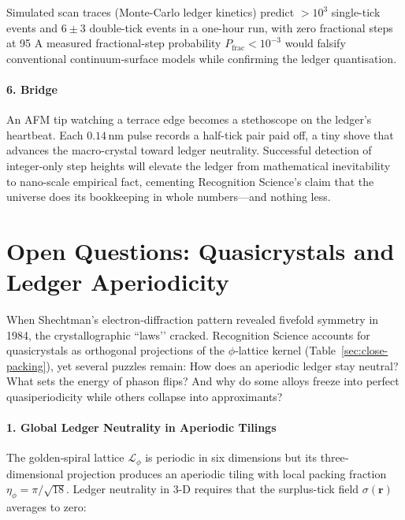 \documentclass[11pt,oneside]{book}
\begin{document}
Simulated scan traces (Monte-Carlo ledger kinetics) predict
\(>10^3\) single-tick events and
\(6\pm3\) double-tick events in a one-hour run, with zero fractional
steps at 95 %
A measured fractional-step probability
\(P_{\text{frac}}<10^{-3}\) would falsify conventional
continuum-surface models while confirming the ledger quantisation.

\paragraph*{6. Bridge}

An AFM tip watching a terrace edge becomes a stethoscope on the
ledger’s heartbeat.  
Each \(0.14\,\text{nm}\) pulse records a half-tick pair paid off, a tiny
shove that advances the macro-crystal toward ledger neutrality.
Successful detection of integer-only step heights will elevate the ledger
from mathematical inevitability to nano-scale empirical fact,
cementing Recognition Science’s claim that the universe does its
bookkeeping in whole numbers—and nothing less.

\bigskip

\section{Open Questions: Quasicrystals and Ledger Aperiodicity}
\label{sec:quasicrystal-open}



When Shechtman’s electron‐diffraction pattern revealed fivefold symmetry
in 1984, the crystallographic “laws’’ cracked.  
Recognition Science accounts for quasicrystals as orthogonal projections
of the $\phi$‐lattice kernel (Table~\ref{sec:close-packing}),  
yet several puzzles remain:  
How does an aperiodic ledger stay neutral?  
What sets the energy of phason flips?  
And why do some alloys freeze into perfect quasiperiodicity while others
collapse into approximants?

\paragraph*{1. Global Ledger Neutrality in Aperiodic Tilings}

The golden‐spiral lattice \(\mathcal L_\phi\) is periodic in
six dimensions but its three‐dimensional projection
produces an aperiodic tiling with local packing fraction
\(\eta_\phi = \pi/\sqrt{18}\).  
Ledger neutrality in 3-D requires that the
surplus-tick field \(\sigma(\mathbf r)\) averages to zero:
\end{document}
